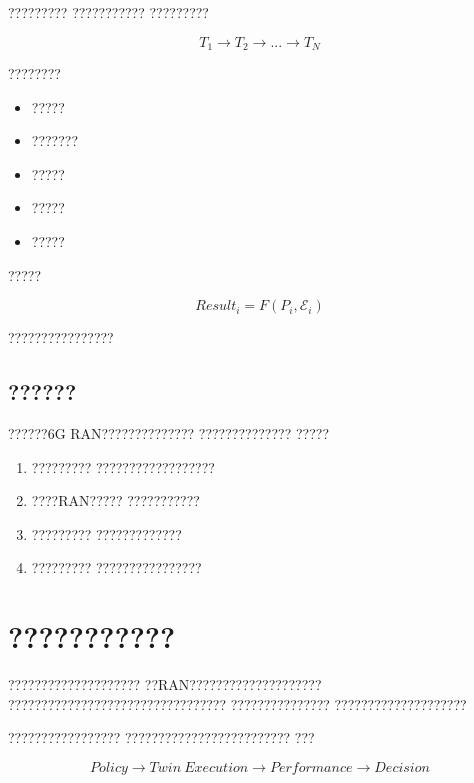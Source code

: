?????????
???????????
?????????

\begin{equation}
T_1
\rightarrow
T_2
\rightarrow
...
\rightarrow
T_N
\end{equation}

????????

\begin{itemize}
    \item ?????
    \item ???????
    \item ?????
    \item ?????
    \item ?????
\end{itemize}


?????

\begin{equation}
Result_i
=
F
(
P_i,
\mathcal{E}_i
)
\end{equation}

????????????????


\subsection*{??????}

??????6G RAN??????????????
??????????????
?????

\begin{enumerate}
    \item ?????????
    ??????????????????

    \item ????RAN?????
    ???????????

    \item ?????????
    ?????????????

    \item ?????????
    ????????????????
\end{enumerate}

\section{???????????}
\label{sec:twin_based_policy_validation}

????????????????????
??RAN????????????????????
?????????????????????????????????
???????????????
????????????????????

?????????????????
?????????????????????????
???

\begin{equation}
Policy
\rightarrow
Twin\ Execution
\rightarrow
Performance
\rightarrow
Decision
\end{equation}

